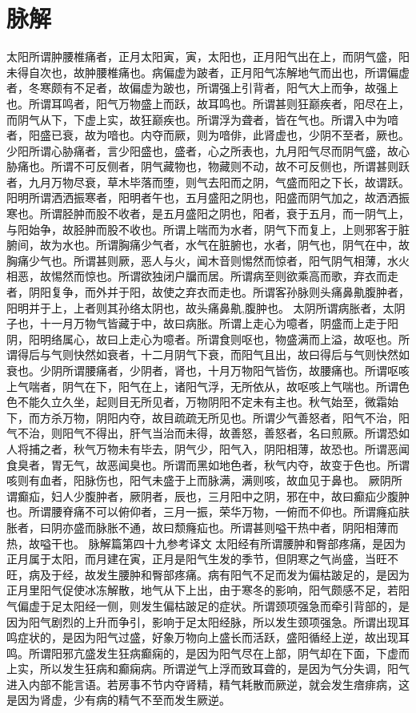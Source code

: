 \documentclass[a4paper,12pt,UTF8,twoside]{ctexbook}
\begin{document}
\chapter{脉解}
太阳所谓肿腰椎痛者，正月太阳寅，寅，太阳也，正月阳气出在上，而阴气盛，阳未得自次也，故肿腰椎痛也。病偏虚为跛者，正月阳气冻解地气而出也，所谓偏虚者，冬寒颇有不足者，故偏虚为跛也，所谓强上引背者，阳气大上而争，故强上也。所谓耳鸣者，阳气万物盛上而跃，故耳鸣也。所谓甚则狂巅疾者，阳尽在上，而阴气从下，下虚上实，故狂巅疾也。所谓浮为聋者，皆在气也。所谓入中为喑者，阳盛已衰，故为喑也。内夺而厥，则为喑俳，此肾虚也，少阴不至者，厥也。
少阳所谓心胁痛者，言少阳盛也，盛者，心之所表也，九月阳气尽而阴气盛，故心胁痛也。所谓不可反侧者，阴气藏物也，物藏则不动，故不可反侧也，所谓甚则跃者，九月万物尽衰，草木毕落而堕，则气去阳而之阴，气盛而阳之下长，故谓跃。
阳明所谓洒洒振寒者，阳明者午也，五月盛阳之阴也，阳盛而阴气加之，故洒洒振寒也。所谓胫肿而股不收者，是五月盛阳之阴也，阳者，衰于五月，而一阴气上，与阳始争，故胫肿而股不收也。所谓上喘而为水者，阴气下而复上，上则邪客于脏腑间，故为水也。所谓胸痛少气者，水气在脏腑也，水者，阴气也，阴气在中，故胸痛少气也。所谓甚则厥，恶人与火，闻木音则惕然而惊者，阳气阴气相薄，水火相恶，故惕然而惊也。所谓欲独闭户牖而居。所谓病至则欲乘高而歌，弃衣而走者，阴阳复争，而外并于阳，故使之弃衣而走也。所谓客孙脉则头痛鼻鼽腹肿者，阳明并于上，上者则其孙络太阴也，故头痛鼻鼽,腹肿也。
太阴所谓病胀者，太阴子也，十一月万物气皆藏于中，故曰病胀。所谓上走心为噫者，阴盛而上走于阳阴，阳明络属心，故曰上走心为噫者。所谓食则呕也，物盛满而上溢，故呕也。所谓得后与气则快然如衰者，十二月阴气下衰，而阳气且出，故曰得后与气则快然如衰也。少阴所谓腰痛者，少阴者，肾也，十月万物阳气皆伤，故腰痛也。所谓呕咳上气喘者，阴气在下，阳气在上，诸阳气浮，无所依从，故呕咳上气喘也。所谓色色不能久立久坐，起则目无所见者，万物阴阳不定未有主也。秋气始至，微霜始下，而方杀万物，阴阳内夺，故目疏疏无所见也。所谓少气善怒者，阳气不治，阳气不治，则阳气不得出，肝气当治而未得，故善怒，善怒者，名曰煎厥。所谓恐如人将捕之者，秋气万物未有毕去，阴气少，阳气入，阴阳相薄，故恐也。所谓恶闻食臭者，胃无气，故恶闻臭也。所谓而黑如地色者，秋气内夺，故变于色也。所谓咳则有血者，阳脉伤也，阳气未盛于上而脉满，满则咳，故血见于鼻也。
厥阴所谓癫疝，妇人少腹肿者，厥阴者，辰也，三月阳中之阴，邪在中，故曰癫疝少腹肿也。所谓腰脊痛不可以俯仰者，三月一振，荣华万物，一俯而不仰也。所谓癃疝肤胀者，曰阴亦盛而脉胀不通，故曰颓癃疝也。所谓甚则嗌干热中者，阴阳相薄而热，故嗌干也。
脉解篇第四十九参考译文
太阳经有所谓腰肿和臀部疼痛，是因为正月属于太阳，而月建在寅，正月是阳气生发的季节，但阴寒之气尚盛，当旺不旺，病及于经，故发生腰肿和臀部疼痛。病有阳气不足而发为偏枯跛足的，是因为正月里阳气促使冰冻解散，地气从下上出，由于寒冬的影响，阳气颇感不足，若阳气偏虚于足太阳经一侧，则发生偏枯跛足的症状。所谓颈项强急而牵引背部的，是因为阳气剧烈的上升而争引，影响于足太阳经脉，所以发生颈项强急。所谓出现耳鸣症状的，是因为阳气过盛，好象万物向上盛长而活跃，盛阳循经上逆，故出现耳鸣。所谓阳邪亢盛发生狂病癫痫的，是因为阳气尽在上部，阴气却在下面，下虚而上实，所以发生狂病和癫痫病。所谓逆气上浮而致耳聋的，是因为气分失调，阳气进入内部不能言语。若房事不节内夺肾精，精气耗散而厥逆，就会发生瘖痱病，这是因为肾虚，少有病的精气不至而发生厥逆。
\end{document}
